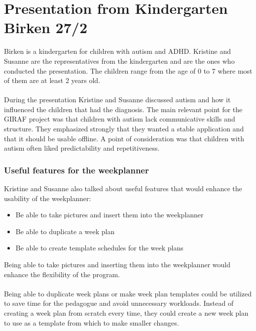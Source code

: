 \section{Presentation from Kindergarten Birken 27/2}\label{presentation-from-birken}
Birken is a kindergarten for children with autism and ADHD.
Kristine and Susanne are the representatives from the kindergarten and are the ones who conducted the presentation.
The children range from the age of 0 to 7 where most of them are at least 2 years old.
\\\\
During the presentation Kristine and Susanne discussed autism and how it influenced the children that had the diagnosis.
The main relevant point for the GIRAF project was that children with autism lack communicative skills and structure. 
They emphasized strongly that they wanted a stable application and that it should be usable offline.
A point of consideration was that children with autism often liked predictability and repetitiveness. 

\subsubsection{Useful features for the weekplanner}
Kristine and Susanne also talked about useful features that would enhance the usability of the weekplanner:

\begin{itemize}
    \item Be able to take pictures and insert them into the weekplanner
    \item Be able to duplicate a week plan
    \item Be able to create template schedules for the week plans
\end{itemize}
\noindent
Being able to take pictures and inserting them into the weekplanner would enhance the flexibility of the program.
\\\\
Being able to duplicate week plans or make week plan templates could be utilized to save time for the pedagogue and avoid unnecessary workloads.
Instead of creating a week plan from scratch every time, they could create a new week plan to use as a template from which to make smaller changes. 
